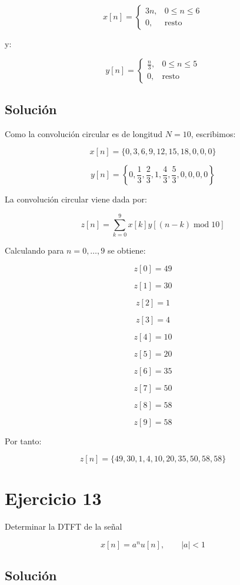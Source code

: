 \documentclass[fleqn]{article}
\begin{document}
	\[
	x[n]=
	\begin{cases}
	3n, & 0\leq n\leq6 \\[1mm]
	0, & \text{resto}
	\end{cases}
	\]

	y:

	\[
	y[n]=
	\begin{cases}
	\displaystyle\frac{n}{3}, & 0\leq n\leq5 \\[1mm]
	0, & \text{resto}
	\end{cases}
	\]

	\subsection{Solución}

	Como la convolución circular es de longitud $N=10$, escribimos:

	\[
	x[n]
	=
	\{0,3,6,9,12,15,18,0,0,0\}
	\]

	\[
	y[n]
	=
	\left\{
	0,\frac{1}{3},\frac{2}{3},1,
	\frac{4}{3},\frac{5}{3},0,0,0,0
	\right\}
	\]

	La convolución circular viene dada por:

	\[
	z[n]
	=
	\sum_{k=0}^{9}
	x[k]y[(n-k)\operatorname{mod}10]
	\]

	Calculando para $n=0,\ldots,9$ se obtiene:

	\[
	z[0]=49
	\]

	\[
	z[1]=30
	\]

	\[
	z[2]=1
	\]

	\[
	z[3]=4
	\]

	\[
	z[4]=10
	\]

	\[
	z[5]=20
	\]

	\[
	z[6]=35
	\]

	\[
	z[7]=50
	\]

	\[
	z[8]=58
	\]

	\[
	z[9]=58
	\]

	Por tanto:

	\[
	\boxed{
	z[n]
	=
	\{49,30,1,4,10,20,35,50,58,58\}
	}
	\]

\section{Ejercicio 13}
	Determinar la DTFT de la señal

	\[
	x[n]=a^nu[n],
	\qquad |a|<1
	\]

	\subsection{Solución}
\end{document}
